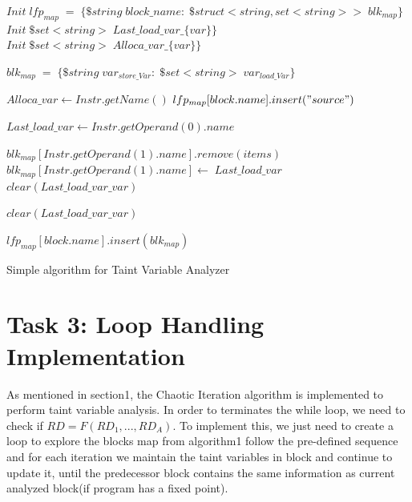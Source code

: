 \documentclass[english,12pt]{article}
\begin{document}
	\begin{algorithm}[H]
		\SetAlgoLined
		\begin{algorithmic}
			\STATE $Init\; lfp_{map}\;=\;\{\$string\;block\_name:\;\$struct<string, set<string> >\;blk_{map}\}$\;
			\STATE $Init\; \$set<string>\;Last\_load\_var\_\{var\}\}$\;
			\STATE $Init\; \$set<string>\;Alloca\_var\_\{var\}\}$\;
			
			\STATE $blk_{map}\;=\;\{\$string\;var_{store\_Var}:\;\$set<string>\;var_{load\_Var}\}$\;
			
			\STATE $Alloca\_var \gets Instr.getName()$
			\STATE $lfp_{map}[block.name].insert("source")$
			\ENDIF
			\ENDIF
			
			\STATE $Last\_load\_var \gets Instr.getOperand(0).name$
			\ENDIF
			
			\STATE $blk_{map}[Instr.getOperand(1).name].remove(items)$
			\STATE $blk_{map}[Instr.getOperand(1).name] \gets \;Last\_load\_var$
			\STATE $clear(Last\_load\_var\_{var})$
			\ENDIF
			
			\STATE $clear(Last\_load\_var\_{var})$
			\ENDIF
			
			\ENDFOR
			\STATE $lfp_{map}[block.name].insert(blk_{map})$
			\ENDFOR
		\end{algorithmic}
		\caption{Simple algorithm for Taint Variable Analyzer}
	\end{algorithm}


	\section{Task 3: Loop Handling Implementation} \label{sec:task3}		 
	As mentioned in section1, the Chaotic Iteration algorithm is implemented to perform taint variable analysis. In order to terminates the while loop, we need to check if $RD = F(RD_1,...,RD_A)$. To implement this, we just need to create a loop to explore the blocks map from algorithm1 follow the pre-defined sequence and for each iteration we maintain the taint variables in block and continue to update it, until the predecessor block contains the same information as current analyzed block(if program has a fixed point).
	
\end{document}
